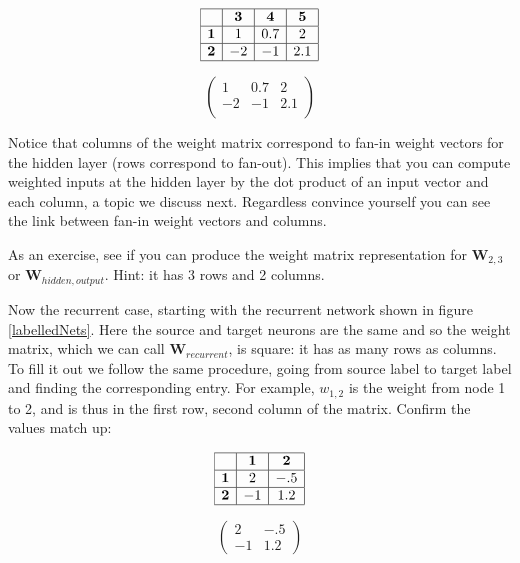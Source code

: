 \begin{minipage}{0.5\textwidth}
\centering
\[
\begin{array}{|c|c|c|c|}
\hline
\multicolumn{1}{|c|}{} & \textbf{3} & \textbf{4} & \textbf{5} \\
\hline
\textbf{1} & 1 & 0.7 & 2 \\
\hline
\textbf{2} & -2 & -1 & 2.1 \\
\hline
\end{array}
\]
\end{minipage}
\begin{minipage}{0.5\textwidth}
\centering
\[
\begin{pmatrix}
1 & 0.7 & 2 \\
-2 & -1 & 2.1 \\
\end{pmatrix}
\]
\end{minipage}
\vspace*{.1cm} 

\noindent Notice that columns of the weight matrix correspond to fan-in weight vectors for the hidden layer (rows correspond to fan-out). This implies that you can compute weighted inputs at the hidden layer by the dot product of an input vector and each column, a topic we discuss next. Regardless convince yourself you can see the link between fan-in weight vectors and columns. 

As an exercise, see if you can produce the weight matrix representation for $\textbf{W}_{2,3}$ or $\textbf{W}_{hidden,output}$. Hint: it has 3 rows and 2 columns. 

Now the recurrent case, starting with the recurrent network shown in figure \ref{labelledNets}. Here the source and target neurons are the same and so the weight matrix, which we can call $\textbf{W}_{recurrent}$, is square: it has as many rows as columns. To fill it out we follow the same procedure, going from source label to target label and finding the corresponding entry. For example, $w_{1,2}$ is the weight from node 1 to 2, and is thus in the first row, second column of the matrix. Confirm the values match up:

\begin{minipage}{0.5\textwidth}
\centering
\[
\begin{array}{|c|c|c|}
\hline
\multicolumn{1}{|c|}{} & \textbf{1} & \textbf{2} \\
\hline
\textbf{1} & 2 & -.5 \\
\hline
\textbf{2} & -1 & 1.2 \\
\hline
\end{array}
\]
\end{minipage}
\begin{minipage}{0.5\textwidth}
\centering
\[
\begin{pmatrix}
 2  &  -.5 \\
 -1  & 1.2 
\end{pmatrix}
\]
\end{minipage}
\vspace*{.1cm} 

